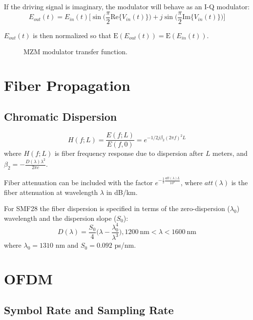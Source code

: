 \documentclass[a4paper]{article}
\begin{document}
If the driving signal is imaginary, the modulator will behave as an I-Q modulator:
\begin{equation}
E_{out}(t) = E_{in}(t)\Big[\sin\Big(\frac{\pi}{2}\mathrm{Re}\{V_{in}(t)\}\Big) + j\sin\Big(\frac{\pi}{2}\mathrm{Im}\{V_{in}(t)\}\Big)\Big]
\end{equation}

$E_{out}(t)$ is then normalized so that $\mathrm{E}(E_{out}(t)) = \mathrm{E}(E_{in}(t))$.

\FloatBarrier
\begin{figure}[h!]
	\centering
	\resizebox{\linewidth}{!}{}
	\caption{MZM modulator transfer function.}
\end{figure}
\FloatBarrier

\section{Fiber Propagation}
\subsection{Chromatic Dispersion}
\begin{equation} \label{eq:Hdisp}
H(f; L) = \frac{E(f; L)}{E(f, 0)} = e^{-1/2j\beta_2(2\pi f)^2L}
\end{equation}
where $H(f; L)$ is fiber frequency response due to dispersion after $L$ meters, and $\beta_2 = -\frac{D(\lambda)\lambda^2}{2\pi c}$. 

Fiber attenuation can be included with the factor $e^{-\frac{1}{2}\frac{att(\lambda)L}{10^4}}$, where $att(\lambda)$ is the fiber attenuation at wavelength $\lambda$ in dB/km.

For SMF28 the fiber dispersion is specified in terms of the zero-dispersion ($\lambda_0$) wavelength and the dispersion slope ($S_0$):
\begin{equation}
D(\lambda) = \frac{S_0}{4}\bigg(\lambda - \frac{\lambda_0^4}{\lambda^3}\bigg), 1200~\text{nm} < \lambda < 1600~\text{nm}
\end{equation}
where $\lambda_0 = 1310$ nm and $S_0 = 0.092$ ps/nm.

\section{OFDM}

\subsection{Symbol Rate and Sampling Rate}
\end{document}
